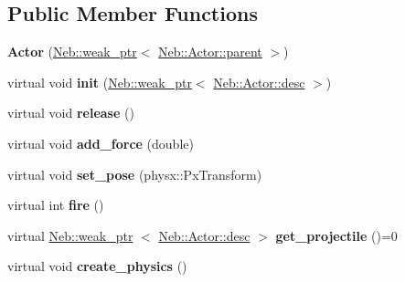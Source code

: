 \subsection*{\-Public \-Member \-Functions}
\begin{DoxyCompactItemize}
\item 
\hypertarget{classNeb_1_1Actor_1_1Actor_aff4a0038bfa4ef4c5bf8dae53e236ea2}{{\bfseries \-Actor} (\hyperlink{classNeb_1_1weak__ptr}{\-Neb\-::weak\-\_\-ptr}$<$ \hyperlink{classNeb_1_1Actor_1_1parent}{\-Neb\-::\-Actor\-::parent} $>$)}\label{classNeb_1_1Actor_1_1Actor_aff4a0038bfa4ef4c5bf8dae53e236ea2}

\item 
\hypertarget{classNeb_1_1Actor_1_1Actor_a8f019d9a792bc0705ef6f32b904709e2}{virtual void {\bfseries init} (\hyperlink{classNeb_1_1weak__ptr}{\-Neb\-::weak\-\_\-ptr}$<$ \hyperlink{classNeb_1_1Actor_1_1desc}{\-Neb\-::\-Actor\-::desc} $>$)}\label{classNeb_1_1Actor_1_1Actor_a8f019d9a792bc0705ef6f32b904709e2}

\item 
\hypertarget{classNeb_1_1Actor_1_1Actor_a9296f86bb7044008369724bd7bdd42d9}{virtual void {\bfseries release} ()}\label{classNeb_1_1Actor_1_1Actor_a9296f86bb7044008369724bd7bdd42d9}

\item 
\hypertarget{classNeb_1_1Actor_1_1Actor_a49e21cfc8c2dd2877a583ae2d517f599}{virtual void {\bfseries add\-\_\-force} (double)}\label{classNeb_1_1Actor_1_1Actor_a49e21cfc8c2dd2877a583ae2d517f599}

\item 
\hypertarget{classNeb_1_1Actor_1_1Actor_a6f71b7a02569e5010f388c07dd27edd5}{virtual void {\bfseries set\-\_\-pose} (physx\-::\-Px\-Transform)}\label{classNeb_1_1Actor_1_1Actor_a6f71b7a02569e5010f388c07dd27edd5}

\item 
\hypertarget{classNeb_1_1Actor_1_1Actor_af919cadc457db374e0502b96e9f23533}{virtual int {\bfseries fire} ()}\label{classNeb_1_1Actor_1_1Actor_af919cadc457db374e0502b96e9f23533}

\item 
\hypertarget{classNeb_1_1Actor_1_1Actor_aacbf027f0fa4bd8c505c7c604f6374c0}{virtual \hyperlink{classNeb_1_1weak__ptr}{\-Neb\-::weak\-\_\-ptr}\*
$<$ \hyperlink{classNeb_1_1Actor_1_1desc}{\-Neb\-::\-Actor\-::desc} $>$ {\bfseries get\-\_\-projectile} ()=0}\label{classNeb_1_1Actor_1_1Actor_aacbf027f0fa4bd8c505c7c604f6374c0}

\item 
\hypertarget{classNeb_1_1Actor_1_1Actor_a281ff959835d2193a555e78f0c14295b}{virtual void {\bfseries create\-\_\-physics} ()}\label{classNeb_1_1Actor_1_1Actor_a281ff959835d2193a555e78f0c14295b}


\end{DoxyCompactItemize}
